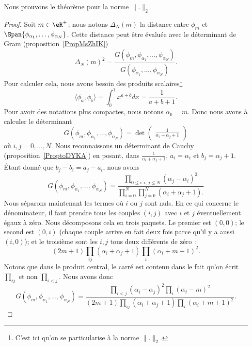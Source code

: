 Nous prouvons le théorème pour la norme \( \| . \|_2\).
\begin{proof}
	Soit \( m\in \eR^+\); nous notons \( \Delta_N(m)\) la distance entre \( \phi_m\) et \( \Span\{ \phi_{\alpha_1},\ldots, \phi_{\alpha_N} \}\). Cette distance peut être évaluée avec le déterminant de Gram (proposition~\ref{PropMsZhIK})
	\begin{equation}
		\Delta_N(m)^2=\frac{ G(\phi_m,\phi_{\alpha_1},\ldots, \phi_{\alpha_N}) }{ G(\phi_{\alpha_1},\ldots, \phi_{\alpha_N}) }.
	\end{equation}
	Pour calculer cela, nous avons besoin des produits scalaires\footnote{C'est ici qu'on se particularise à la norme \( \| . \|_2\).}
	\begin{equation}
		\langle \phi_a, \phi_b\rangle =\int_0^1 x^{a+b}dx=\frac{1}{ a+b+1 }.
	\end{equation}
	Pour avoir des notations plus compactes, nous notons \( \alpha_0=m\). Donc nous avons à calculer le déterminant
	\begin{equation}
		G(\phi_m,\phi_{\alpha_1},\ldots, \phi_{\alpha_N})=\det\begin{pmatrix}
			\frac{1}{ \alpha_i+\alpha_j+1 }
		\end{pmatrix}
	\end{equation}
	où \( i,j=0,\ldots, N\). Nous reconnaissons un déterminant de Cauchy (proposition~\ref{ProptoDYKA}) en posant, dans \( \frac{1}{ \alpha_i+\alpha_j+1 }\), \( a_i=\alpha_i\) et \( b_j=\alpha_j+1\). Étant donné que \( b_j-b_i=a_j-a_i\), nous avons
	\begin{equation}
		G(\phi_m,\phi_{\alpha_1},\ldots, \phi_{\alpha_N})=\frac{ \prod_{0\leq i<j\leq N}  (\alpha_j-\alpha_i)^2 }{ \prod_{i=0}^N\prod_{j=0}^N (\alpha_i+\alpha_j+1).}
	\end{equation}
	Nous séparons maintenant les termes où \( i\) ou \( j\) sont nuls. En ce qui concerne le dénominateur, il faut prendre tous les couples \( (i,j)\) avec \( i\) et \( j\) éventuellement égaux à zéro. Nous décomposons cela en trois paquets. Le premier est \( (0,0)\); le second est \( (0,i)\) (chaque couple arrive en fait deux fois parce qu'il y a aussi \( (i,0)\)); et le troisième sont les \( i,j\) tous deux différents de zéro :
	\begin{equation}
		(2m+1)\prod_{ij}(\alpha_i+\alpha_j+1)\prod_i(\alpha_i+m+1)^2.
	\end{equation}
	Notons que dans le produit central, le carré est contenu dans le fait qu'on écrit \( \prod_{ij}\) et non \( \prod_{i<j}\). Nous avons donc
	\begin{equation}
		G(\phi_m,\phi_{\alpha_1},\ldots, \phi_{\alpha_N})=\frac{ \prod_{i<j}(\alpha_i-\alpha_j)^2\prod_i(\alpha_i-m)^2 }{ (2m+1)\prod_{ij}(\alpha_i+\alpha_j+1)\prod_i(\alpha_i+m+1)^2 }.
	\end{equation}


\end{proof}
